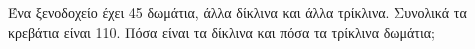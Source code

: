 Ένα ξενοδοχείο έχει 45 δωμάτια, άλλα δίκλινα και άλλα τρίκλινα. Συνολικά τα κρεβάτια είναι 110. Πόσα είναι τα δίκλινα και πόσα τα τρίκλινα δωμάτια;
